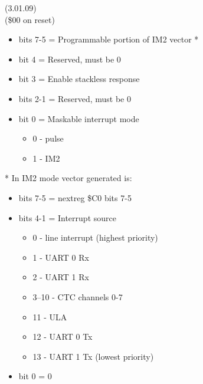  (3.01.09)\\
(\$00 on reset)
\begin{itemize}
\item bits 7-5 = Programmable portion of IM2 vector *
\item bit 4 = Reserved, must be 0
\item bit 3 = Enable stackless  response
\item bits 2-1 = Reserved, must be 0
\item bit 0 = Maskable interrupt mode
\begin{itemize}
\item[] 0 - pulse
\item[] 1 - IM2
\end{itemize}
\end{itemize}
* In IM2 mode vector generated is:
\begin{itemize}
\item bits 7-5 = nextreg \$C0 bits 7-5
\item bits 4-1 = Interrupt source
\begin{itemize}
\item[] 0 - line interrupt (highest priority)
\item[] 1 - UART 0 Rx
\item[] 2 - UART 1 Rx
\item[] 3--10 - CTC channels 0-7
\item[] 11 - ULA
\item[] 12 - UART 0 Tx
\item[] 13 - UART 1 Tx (lowest priority)
\end{itemize}
\item bit 0 = 0
\end{itemize}

